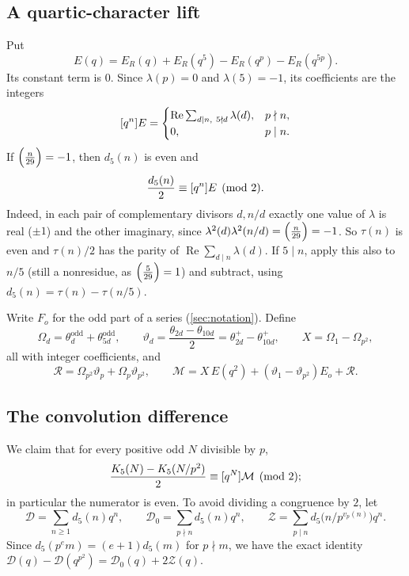 \subsection{A quartic-character lift}
Put
\[
  E(q)=E_R(q)+E_R(q^5)-E_R(q^p)-E_R(q^{5p}).
\]
Its constant term is $0$. Since $\lambda(p)=0$ and $\lambda(5)=-1$, its coefficients are
the integers
\[
  [q^{n}]E=\begin{cases}\operatorname{Re}\sum_{d\mid n,\ 5\nmid d}\lambda(d),&p\nmid n,\\ 0,&p\mid n.\end{cases}
\]
If $\Bigl(\frac{n}{29}\Bigr)=-1$, then $d_5(n)$ is even and
\begin{equation}\label{eq:d5-half}
  \frac{d_5(n)}2\equiv[q^{n}]E\pmod2 .
\end{equation}
Indeed, in each pair of complementary divisors $d,n/d$ exactly one value of
$\lambda$ is real ($\pm1$) and the other imaginary, since
$\lambda^2(d)\lambda^2(n/d)=\Bigl(\frac{n}{29}\Bigr)=-1$. So $\tau(n)$ is even and $\tau(n)/2$ has the
parity of $\operatorname{Re}\sum_{d\mid n}\lambda(d)$. If $5\mid n$, apply this also to
$n/5$ (still a nonresidue, as $\Bigl(\frac{5}{29}\Bigr)=1$) and subtract, using
$d_5(n)=\tau(n)-\tau(n/5)$.

Write $F_o$ for the odd part of a series (\cref{sec:notation}). Define
\[
  \Omega_d=\theta^{\mathrm{odd}}_d+\theta^{\mathrm{odd}}_{5d},\qquad
  \vartheta_d=\frac{\theta_{2d}-\theta_{10d}}2=\theta^+_{2d}-\theta^+_{10d},\qquad
  X=\Omega_1-\Omega_{p^2},
\]
all with integer coefficients, and
\[
  \mathcal R=\Omega_{p^2}\vartheta_p+\Omega_p\vartheta_{p^2},\qquad
  \mathcal M=X\,E(q^2)+(\vartheta_1-\vartheta_{p^2})E_o+\mathcal R .
\]

\subsection{The convolution difference}
We claim that for every positive odd $N$ divisible by $p$,
\begin{equation}\label{eq:conv-diff}
  \frac{K_5(N)-K_5(N/p^2)}2\equiv[q^{N}]\mathcal M\pmod2 ;
\end{equation}
in particular the numerator is even. To avoid dividing a congruence by $2$, let
\[
  \mathcal D=\sum_{n\ge1}d_5(n)q^n,\qquad
  \mathcal D_0=\sum_{p\nmid n}d_5(n)q^n,\qquad
  \mathcal Z=\sum_{p\mid n}d_5\bigl(n/p^{v_p(n)}\bigr)q^n .
\]
Since $d_5(p^em)=(e+1)d_5(m)$ for $p\nmid m$, we have the exact identity
$\mathcal D(q)-\mathcal D(q^{p^2})=\mathcal D_0(q)+2\mathcal Z(q)$.

